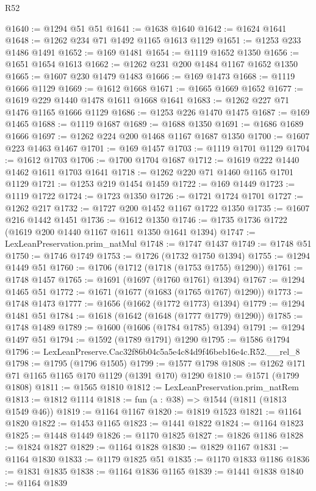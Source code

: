 \begin{lexlean}{R52}
\begin{coremodule}
@1640 := @1294 @51 @51
@1641 := @1638 @1640
@1642 := @1624 @1641
@1648 := @1262 @234 @71 @1492 @1165 @1613 @1129
@1651 := @1253 @233 @1486 @1491
@1652 := @169 @1481
@1654 := @1119 @1652 @1350
@1656 := @1651 @1654 @1613
@1662 := @1262 @231 @200 @1484 @1167 @1652 @1350
@1665 := @1607 @230 @1479 @1483
@1666 := @169 @1473
@1668 := @1119 @1666 @1129
@1669 := @1612 @1668
@1671 := @1665 @1669 @1652
@1677 := @1619 @229 @1440 @1478 @1611 @1668 @1641
@1683 := @1262 @227 @71 @1476 @1165 @1666 @1129
@1686 := @1253 @226 @1470 @1475
@1687 := @169 @1465
@1688 := @1119 @1687
@1689 := @1688 @1350
@1691 := @1686 @1689 @1666
@1697 := @1262 @224 @200 @1468 @1167 @1687 @1350
@1700 := @1607 @223 @1463 @1467
@1701 := @169 @1457
@1703 := @1119 @1701 @1129
@1704 := @1612 @1703
@1706 := @1700 @1704 @1687
@1712 := @1619 @222 @1440 @1462 @1611 @1703 @1641
@1718 := @1262 @220 @71 @1460 @1165 @1701 @1129
@1721 := @1253 @219 @1454 @1459
@1722 := @169 @1449
@1723 := @1119 @1722
@1724 := @1723 @1350
@1726 := @1721 @1724 @1701
@1727 := @1262 @217
@1732 := @1727 @200 @1452 @1167 @1722 @1350
@1735 := @1607 @216 @1442 @1451
@1736 := @1612 @1350
@1746 := @1735 @1736 @1722 (@1619 @200 @1440 @1167 @1611 @1350 @1641 @1394)
@1747 := LexLeanPreservation.prim_natMul
@1748 := @1747 @1437
@1749 := @1748 @51
@1750 := @1746 @1749
@1753 := @1726 (@1732 @1750 @1394)
@1755 := @1294 @1449 @51
@1760 := @1706 (@1712 (@1718 (@1753 @1755) @1290))
@1761 := @1748 @1457
@1765 := @1691 (@1697 (@1760 @1761) @1394)
@1767 := @1294 @1465 @51
@1772 := @1671 (@1677 (@1683 (@1765 @1767) @1290))
@1773 := @1748 @1473
@1777 := @1656 (@1662 (@1772 @1773) @1394)
@1779 := @1294 @1481 @51
@1784 := @1618 (@1642 (@1648 (@1777 @1779) @1290))
@1785 := @1748 @1489
@1789 := @1600 (@1606 (@1784 @1785) @1394)
@1791 := @1294 @1497 @51
@1794 := @1592 (@1789 @1791) @1290
@1795 := @1586 @1794
@1796 := LexLeanPreserve.Cac32f86b04c5a5e4c84d9f46beb16e4c.R52.__rel_8
@1798 := @1795 (@1796 @1505)
@1799 := @1577 @1798
@1808 := @1262 @171 @71 @1165 @1165 @170 @1129 (@1391 @170) @1290
@1810 := @1571 (@1799 @1808)
@1811 := @1565 @1810
@1812 := LexLeanPreservation.prim_natRem
@1813 := @1812 @1114
@1818 := fun (a : @38) => @1544 (@1811 (@1813 @1549 @46))
@1819 := @1164 @1167
@1820 := @1819 @1523
@1821 := @1164 @1820
@1822 := @1453 @1165
@1823 := @1441 @1822
@1824 := @1164 @1823
@1825 := @1448 @1449
@1826 := @1170 @1825
@1827 := @1826 @1186
@1828 := @1824 @1827
@1829 := @1164 @1828
@1830 := @1829 @1167
@1831 := @1164 @1830
@1833 := @1179 @1825 @51
@1835 := @1170 @1833 @1186
@1836 := @1831 @1835
@1838 := @1164 @1836 @1165
@1839 := @1441 @1838
@1840 := @1164 @1839

\end{coremodule}
\end{lexlean}
